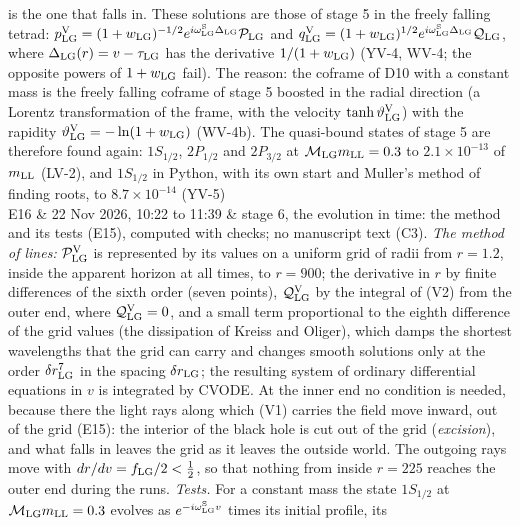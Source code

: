 \documentclass[
  10pt,
]{article}
\begin{document}
\begin{longtable}[]
is the one that falls in. These solutions are those of stage 5 in the
freely falling tetrad:
\(p^{\rm V}_{\rm LG}=(1+w_{\rm LG})^{-1/2}e^{i\omega^{\rm S}_{\rm LG}\Delta_{\rm LG}}\mathcal P_{\rm LG}\)
and
\(q^{\rm V}_{\rm LG}=(1+w_{\rm LG})^{1/2}e^{i\omega^{\rm S}_{\rm LG}\Delta_{\rm LG}}\mathcal Q_{\rm LG}\),
where \(\Delta_{\rm LG}(r)=v-\tau_{\rm LG}\) has the derivative
\(1/(1+w_{\rm LG})\) (YV-4, WV-4; the opposite powers of
\(1+w_{\rm LG}\) fail). The reason: the coframe of D10 with a constant
mass is the freely falling coframe of stage 5 boosted in the radial
direction (a Lorentz transformation of the frame, with the velocity
\(\tanh\vartheta^{\rm V}_{\rm LG}\)) with the rapidity
\(\vartheta^{\rm V}_{\rm LG}=-\ln(1+w_{\rm LG})\) (WV-4b). The
quasi-bound states of stage 5 are therefore found again: \(1S_{1/2}\),
\(2P_{1/2}\) and \(2P_{3/2}\) at \(\mathcal M_{\rm LG}m_{\rm LL}=0.3\)
to \(2.1\times10^{-13}\) of \(m_{\rm LL}\) (LV-2), and \(1S_{1/2}\) in
Python, with its own start and Muller's method of finding roots, to
\(8.7\times10^{-14}\) (YV-5) \\
E16 & 22 Nov 2026, 10:22 to 11:39 & stage 6, the evolution in time: the
method and its tests (E15), computed with checks; no manuscript text
(C3). \emph{The method of lines:} \(\mathcal P^{\rm V}_{\rm LG}\) is
represented by its values on a uniform grid of radii from \(r=1.2\),
inside the apparent horizon at all times, to \(r=900\); the derivative
in \(r\) by finite differences of the sixth order (seven points),
\(\mathcal Q^{\rm V}_{\rm LG}\) by the integral of (V2) from the outer
end, where \(\mathcal Q^{\rm V}_{\rm LG}=0\), and a small term
proportional to the eighth difference of the grid values (the
dissipation of Kreiss and Oliger), which damps the shortest wavelengths
that the grid can carry and changes smooth solutions only at the order
\(\delta r_{\rm LG}^7\) in the spacing \(\delta r_{\rm LG}\); the
resulting system of ordinary differential equations in \(v\) is
integrated by CVODE. At the inner end no condition is needed, because
there the light rays along which (V1) carries the field move inward, out
of the grid (E15): the interior of the black hole is cut out of the grid
(\emph{excision}), and what falls in leaves the grid as it leaves the
outside world. The outgoing rays move with
\(dr/dv=f_{\rm LG}/2<\tfrac12\), so that nothing from inside \(r=225\)
reaches the outer end during the runs. \emph{Tests.} For a constant mass
the state \(1S_{1/2}\) at \(\mathcal M_{\rm LG}m_{\rm LL}=0.3\) evolves
as \(e^{-i\omega^{\rm S}_{\rm LG}v}\) times its initial profile, its

\end{longtable}
\end{document}
